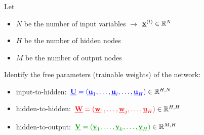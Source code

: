 \begin{frame}\frametitle{\subsubsecname}


Let
\begin{itemize}
\item[] $N$ be the number of input variables $\rightarrow$ $\underline{\mathbf{x}}^{(t)} \in \mathbb{R}^N$
\item[] $H$ be the number of hidden nodes
\item[] $M$ be the number of output nodes
\end{itemize}

\pause

\newpage

Identify the free parameters (trainable weights) of the network:

\begin{itemize}
\item input-to-hidden: ${\color{blue} \underline{\mathbf{U}} = (\underline{\mathbf{u}}_1,\ldots, \underline{\mathbf{u}}_i, \ldots,\underline{\mathbf{u}}_H)} \in \mathbb{R}^{H,N}$
\item hidden-to-hidden: ${\color{red} \underline{\mathbf{W}} = (\underline{\mathbf{w}}_1,\ldots, \underline{\mathbf{w}}_j, \ldots,\underline{\mathbf{u}}_H)} \in \mathbb{R}^{H,H}$
\item hidden-to-output: ${\color{darkgreen} \vec V = (\vec v_1,\ldots, \vec v_k, \ldots,\vec v_H)} \in \R^{M,H}$
\end{itemize}




\end{frame}

